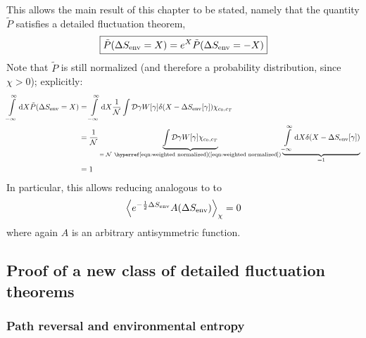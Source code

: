 This allows the main result of this chapter to be stated, namely that the quantity \(\tilde P\) satisfies a detailed fluctuation theorem,
%
\begin{equation}
	\label{eqn:SEnv fluctuation theorem}
	\boxed{
		\tilde P(\Delta S_\text{env} = X) = e^X \tilde P(\Delta S_\text{env} = -X)
	}
\end{equation}
%
Note that \(\tilde P\) is still normalized (and therefore a probability distribution, since \(\chi > 0\)); explicitly:
\begin{equation}
	\begin{split}
	   \inflint\d X \tilde P(\Delta\SEnv = X)
	&= \inflint\d X \frac1{\Cal N} \int\Cal D\gamma W[\gamma] \delta(X-\Delta\SEnv[\gamma]) \chi_{c_0,c_T}
	\\
	&=  \frac1{\Cal N} \underbrace{\int\Cal D\gamma W[\gamma] \chi_{c_0,c_T}}_{=\; \Cal N ~ \text{\RefEqn{eqn:weighted normalized}}}
	    \underbrace{\inflint\d X \delta(X-\Delta\SEnv[\gamma])}_{=1}  \\
	&= 1
	\end{split}
\end{equation}
%
In particular, this allows reducing  analogous to  to
\begin{equation}
	\label{eqn:SEnv asymmetric average}
	\left\langle e^{-\frac12\Delta S_\text{env}} A(\Delta S_\text{env})\right\rangle_\chi = 0
\end{equation}
%
where again \(A\) is an arbitrary antisymmetric function.





\subsection{Proof of a new class of detailed fluctuation theorems}



\subsubsection{Path reversal and environmental entropy}

